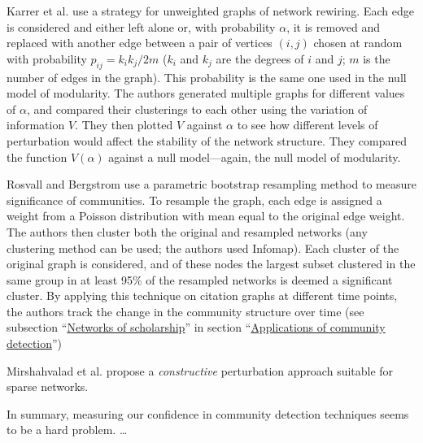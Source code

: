 Karrer et al. \autocite{karrer_robustness_2008} use a strategy for
unweighted graphs of network rewiring. Each edge is considered and
either left alone or, with probability \(\alpha\), it is removed and
replaced with another edge between a pair of vertices \((i, j)\) chosen
at random with probability \(p_{ij} = k_i k_j / 2m\) (\(k_i\) and
\(k_j\) are the degrees of \(i\) and \(j\); \(m\) is the number of edges
in the graph). This probability is the same one used in the null model
of modularity. The authors generated multiple graphs for different
values of \(\alpha\), and compared their clusterings to each other using
the variation of information \(V\). They then plotted \(V\) against
\(\alpha\) to see how different levels of perturbation would affect the
stability of the network structure. They compared the function
\(V(\alpha)\) against a null model---again, the null model of
modularity.

Rosvall and Bergstrom use a parametric bootstrap resampling method to
measure significance of communities. To resample the graph, each edge is
assigned a weight from a Poisson distribution with mean equal to the
original edge weight. The authors then cluster both the original and
resampled networks (any clustering method can be used; the authors used
Infomap). Each cluster of the original graph is considered, and of these
nodes the largest subset clustered in the same group in at least 95\% of
the resampled networks is deemed a significant cluster. By applying this
technique on citation graphs at different time points, the authors track
the change in the community structure over time (see subsection
``\protect\hyperlink{networks-of-scholarship}{Networks of scholarship}''
in section ``\protect\hyperlink{applications}{Applications of community
detection}'')

Mirshahvalad et al. \autocite{mirshahvalad_significant_2012} propose a
\emph{constructive} perturbation approach suitable for sparse networks.

In summary, measuring our confidence in community detection techniques
seems to be a hard problem. \ldots{}


